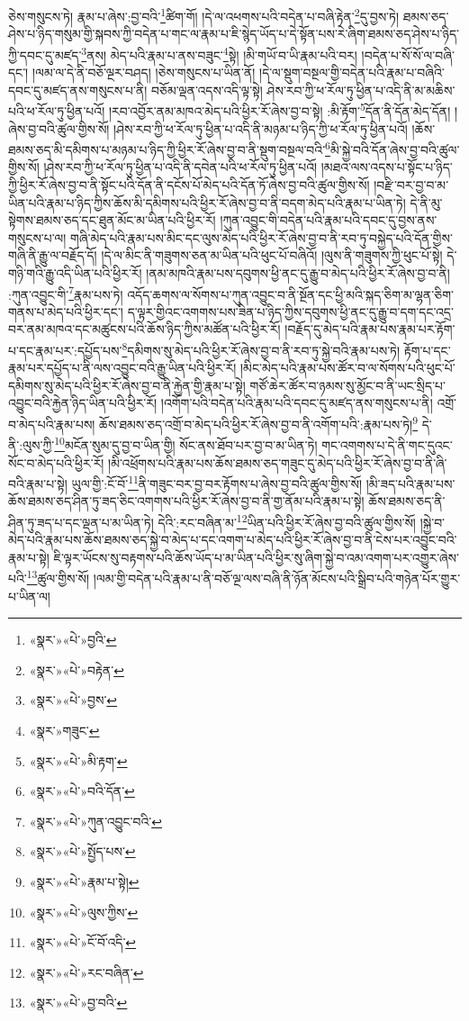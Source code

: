 ཅེས་གསུངས་ཏེ། རྣམ་པ་ཞེས་:བྱ་བའི་\footnote{«སྣར་»«པེ་»བྱའི་}ཚིག་གོ། །དེ་ལ་འཕགས་པའི་བདེན་པ་བཞི་རྟེན་\footnote{«སྣར་»«པེ་»བརྟེན་}དུ་བྱས་ཏེ། ཐམས་ཅད་ཤེས་པ་ཉིད་གསུམ་གྱི་སྐབས་ཀྱི་བདེན་པ་གང་ལ་རྣམ་པ་ཇི་སྙེད་ཡོད་པ་དེ་སྟོན་པས་རེ་ཞིག་ཐམས་ཅད་ཤེས་པ་ཉིད་ཀྱི་དབང་དུ་མཛད་\footnote{«སྣར་»«པེ་»བྱས་}ནས། མེད་པའི་རྣམ་པ་ནས་བཟུང་\footnote{«སྣར་»གཟུང་}སྟེ། །མི་གཡོ་བ་ཡི་རྣམ་པའི་བར། །བདེན་པ་སོ་སོ་ལ་བཞི་དང་། །ལམ་ལ་དེ་ནི་བཅོ་ལྔར་བཤད། །ཅེས་གསུངས་པ་ཡིན་ནོ། །དེ་ལ་སྡུག་བསྔལ་གྱི་བདེན་པའི་རྣམ་པ་བཞིའི་དབང་དུ་མཛད་ནས་གསུངས་པ་ནི། བཅོམ་ལྡན་འདས་འདི་ལྟ་སྟེ། ཤེས་རབ་ཀྱི་ཕ་རོལ་ཏུ་ཕྱིན་པ་འདི་ནི་མ་མཆིས་པའི་ཕ་རོལ་ཏུ་ཕྱིན་པའོ། །རབ་འབྱོར་ནམ་མཁའ་མེད་པའི་ཕྱིར་རོ་ཞེས་བྱ་བ་སྟེ། :མི་རྟོག་\footnote{«སྣར་»«པེ་»མི་རྟག་}དོན་ནི་དོན་མེད་དོན། །ཞེས་བྱ་བའི་ཚུལ་གྱིས་སོ། །ཤེས་རབ་ཀྱི་ཕ་རོལ་ཏུ་ཕྱིན་པ་འདི་ནི་མཉམ་པ་ཉིད་ཀྱི་ཕ་རོལ་ཏུ་ཕྱིན་པའོ། །ཆོས་ཐམས་ཅད་མི་དམིགས་པ་མཉམ་པ་ཉིད་ཀྱི་ཕྱིར་རོ་ཞེས་བྱ་བ་ནི་སྡུག་བསྔལ་བའི་\footnote{«སྣར་»«པེ་»བའི་དོན་}མི་སྐྱེ་བའི་དོན་ཞེས་བྱ་བའི་ཚུལ་གྱིས་སོ། །ཤེས་རབ་ཀྱི་ཕ་རོལ་ཏུ་ཕྱིན་པ་འདི་ནི་དབེན་པའི་ཕ་རོལ་ཏུ་ཕྱིན་པའོ། །མཐའ་ལས་འདས་པ་སྟོང་པ་ཉིད་ཀྱི་ཕྱིར་རོ་ཞེས་བྱ་བ་ནི་སྟོང་པའི་དོན་ནི་དངོས་པོ་མེད་པའི་དོན་ཏོ་ཞེས་བྱ་བའི་ཚུལ་གྱིས་སོ། །བརྫི་བར་བྱ་བ་མ་ཡིན་པའི་རྣམ་པ་ཉིད་ཀྱིས་ཆོས་མི་དམིགས་པའི་ཕྱིར་རོ་ཞེས་བྱ་བ་ནི་བདག་མེད་པའི་རྣམ་པ་ཡིན་ཏེ། དེ་ནི་མུ་སྟེགས་ཐམས་ཅད་དང་ཐུན་མོང་མ་ཡིན་པའི་ཕྱིར་རོ། །ཀུན་འབྱུང་གི་བདེན་པའི་རྣམ་པའི་དབང་དུ་བྱས་ནས་གསུངས་པ་ལ། གཞི་མེད་པའི་རྣམ་པས་མིང་དང་ལུས་མེད་པའི་ཕྱིར་རོ་ཞེས་བྱ་བ་ནི་རབ་ཏུ་བསྐྱེད་པའི་དོན་གྱིས་གཞི་ནི་རྒྱུ་ལ་བརྗོད་དོ། །དེ་ལ་མིང་ནི་གཟུགས་ཅན་མ་ཡིན་པའི་ཕུང་པོ་བཞིའོ། །ལུས་ནི་གཟུགས་ཀྱི་ཕུང་པོ་སྟེ། དེ་གཉི་གའི་རྒྱུ་འདི་ཡིན་པའི་ཕྱིར་རོ། །ནམ་མཁའི་རྣམ་པས་དབུགས་ཕྱི་ནང་དུ་རྒྱུ་བ་མེད་པའི་ཕྱིར་རོ་ཞེས་བྱ་བ་ནི། :ཀུན་འབྱུང་གི་\footnote{«སྣར་»«པེ་»ཀུན་འབྱུང་བའི་}རྣམ་པས་ཏེ། འདོད་ཆགས་ལ་སོགས་པ་ཀུན་འབྱུང་བ་ནི་སྔོན་དང་ཕྱི་མའི་སྐད་ཅིག་མ་ལྷན་ཅིག་གནས་པ་མེད་པའི་ཕྱིར་དང་། ད་ལྟར་གྱིའང་འགགས་པས་ཟིན་པ་ཉིད་ཀྱིས་དབུགས་ཕྱི་ནང་དུ་རྒྱུ་བ་དག་དང་འདྲ་བར་ནམ་མཁའ་དང་མཚུངས་པའི་ཆོས་ཉིད་ཀྱིས་མཚོན་པའི་ཕྱིར་རོ། །བརྗོད་དུ་མེད་པའི་རྣམ་པས་རྣམ་པར་རྟོག་པ་དང་རྣམ་པར་:དཔྱོད་པས་\footnote{«སྣར་»«པེ་»སྤྱོད་པས་}དམིགས་སུ་མེད་པའི་ཕྱིར་རོ་ཞེས་བྱ་བ་ནི་རབ་ཏུ་སྐྱེ་བའི་རྣམ་པས་ཏེ། རྟོག་པ་དང་རྣམ་པར་དཔྱོད་པ་ནི་ལས་འབྱུང་བའི་རྒྱུ་ཡིན་པའི་ཕྱིར་རོ། །མིང་མེད་པའི་རྣམ་པས་ཚོར་བ་ལ་སོགས་པའི་ཕུང་པོ་དམིགས་སུ་མེད་པའི་ཕྱིར་རོ་ཞེས་བྱ་བ་ནི་རྐྱེན་གྱི་རྣམ་པ་སྟེ། གཙོ་ཆེར་ཚོར་བ་ཉམས་སུ་མྱོང་བ་ནི་ཡང་སྲིད་པ་འབྱུང་བའི་རྐྱེན་ཉིད་ཡིན་པའི་ཕྱིར་རོ། །འགོག་པའི་བདེན་པའི་རྣམ་པའི་དབང་དུ་མཛད་ནས་གསུངས་པ་ནི། འགྲོ་བ་མེད་པའི་རྣམ་པས། ཆོས་ཐམས་ཅད་འགྲོ་བ་མེད་པའི་ཕྱིར་རོ་ཞེས་བྱ་བ་ནི་འགོག་པའི་:རྣམ་པས་ཏེ།\footnote{«སྣར་»«པེ་»རྣམ་པ་སྟེ།} དེ་ནི་:ལུས་ཀྱི་\footnote{«སྣར་»«པེ་»ལུས་ཀྱིས་}མངོན་སུམ་དུ་བྱ་བ་ཡིན་གྱི། སོང་ནས་ཐོབ་པར་བྱ་བ་མ་ཡིན་ཏེ། གང་འགགས་པ་དེ་ནི་གང་དུའང་སོང་བ་མེད་པའི་ཕྱིར་རོ། །མི་འཕྲོགས་པའི་རྣམ་པས་ཆོས་ཐམས་ཅད་གཟུང་དུ་མེད་པའི་ཕྱིར་རོ་ཞེས་བྱ་བ་ནི་ཞི་བའི་རྣམ་པ་སྟེ། ཡུལ་གྱི་:ངོ་བོ་\footnote{«སྣར་»«པེ་»ངོ་བོ་འདི་}ནི་གཟུང་བར་བྱ་བར་རྟོགས་པ་ཞེས་བྱ་བའི་ཚུལ་གྱིས་སོ། །མི་ཟད་པའི་རྣམ་པས་ཆོས་ཐམས་ཅད་ཤིན་ཏུ་ཟད་ཅིང་འགགས་པའི་ཕྱིར་རོ་ཞེས་བྱ་བ་ནི་གྱ་ནོམ་པའི་རྣམ་པ་སྟེ། ཆོས་ཐམས་ཅད་ནི་ཤིན་ཏུ་ཟད་པ་དང་ལྡན་པ་མ་ཡིན་ཏེ། དེའི་:རང་བཞིན་མ་\footnote{«སྣར་»«པེ་»རང་བཞིན་}ཡིན་པའི་ཕྱིར་རོ་ཞེས་བྱ་བའི་ཚུལ་གྱིས་སོ། །སྐྱེ་བ་མེད་པའི་རྣམ་པས་ཆོས་ཐམས་ཅད་སྐྱེ་བ་མེད་པ་དང་འགག་པ་མེད་པའི་ཕྱིར་རོ་ཞེས་བྱ་བ་ནི་ངེས་པར་འབྱུང་བའི་རྣམ་པ་སྟེ། ཇི་ལྟར་ཡོངས་སུ་བརྟགས་པའི་ཆོས་ཡོད་པ་མ་ཡིན་པའི་ཕྱིར་སུ་ཞིག་སྐྱེ་བ་འམ་འགག་པར་འགྱུར་ཞེས་པའི་\footnote{«སྣར་»«པེ་»བྱ་བའི་}ཚུལ་གྱིས་སོ། །ལམ་གྱི་བདེན་པའི་རྣམ་པ་ནི་བཅོ་ལྔ་ལས་བཞི་ནི་ཉོན་མོངས་པའི་སྒྲིབ་པའི་གཉེན་པོར་གྱུར་པ་ཡིན་ལ། 